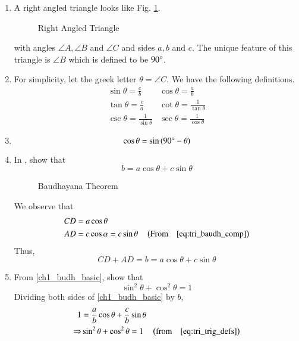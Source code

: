 %
\begin{enumerate}[label=\thesection.\arabic*.,ref=\thesection.\theenumi]
%
	\item 
A right angled triangle looks like Fig. \ref{fig:tri_right_angle}.
\begin{figure}[!ht]
\centering
\resizebox{0.6\columnwidth}{!}{}
\caption{Right Angled Triangle}
\label{fig:tri_right_angle}	
\end{figure}
with angles $\angle A,\angle B$ and $\angle C$ and sides $a, b$ and $c$.  The unique feature of this triangle is $\angle B$ which is defined to be $90\degree$.
\item
	For simplicity, let the greek letter $\theta = \angle C$.  We have the following definitions.
\begin{equation}
\label{eq:tri_trig_defs}
\begin{matrix}
	\sin \theta = \frac{c}{b} & 	\cos \theta = \frac{a}{b} \\[1ex]
	\tan \theta = \frac{c}{a} & \cot \theta = \frac{1}{\tan \theta} \\[1ex]
	\csc \theta = \frac{1}{\sin \theta} & \sec \theta = \frac{1}{\cos \theta}
	\end{matrix}
\end{equation}
\item  
	\begin{equation}
	\cos \theta = \sin \left(90\degree - \theta\right)
	\label{eq:tri_baudh_comp}	
	\end{equation}
\item
In  , 
show that 
%
\begin{equation}
\label{ch1_budh_basic}
b = a \cos \theta + c \sin \theta
\end{equation}
%
\begin{figure}[!ht]
	\begin{center}
		\resizebox{0.6\columnwidth}{!}{}
	\end{center}
	\caption{Baudhayana Theorem}
	\label{fig:tri_baudh}	
\end{figure}
\solution We observe that
%
\begin{align}
CD &= a \cos \theta \\
AD &= c \cos\alpha = c \sin \theta \quad \left(\text{From} \quad 
	\eqref{eq:tri_baudh_comp}	
\right)
\end{align}
%
Thus,
\begin{equation}
CD + AD = b = a \cos \theta + c \sin \theta
\end{equation}
\item
From \eqref{ch1_budh_basic}, show that
%
\begin{equation}
%
\label{eq:tri_sin_cos_id}
\sin ^2 \theta + \cos ^2 \theta = 1
\end{equation}
%
\solution Dividing both sides of \eqref{ch1_budh_basic} by $b$, 
\begin{align}
1 &= \frac{a}{b}\cos\theta + \frac{c}{b}\sin\theta\\
\Rightarrow &\sin ^2 \theta + \cos ^2 \theta = 1 \quad \left(\text{from} \quad \eqref{eq:tri_trig_defs}\right)
\end{align}


\end{enumerate}
